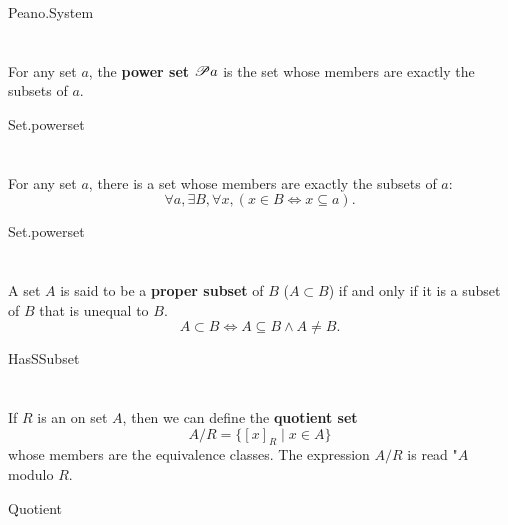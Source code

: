 \documentclass{report}
\begin{document}
    {Peano.System}

\section{}%

  For any set $a$, the \textbf{power set $\mathscr{P}a$} is the set whose
    members are exactly the subsets of $a$.

    {Set.powerset}

\section{}%

  For any set $a$, there is a set whose members are exactly the subsets of $a$:
    $$\forall a, \exists B, \forall x, (x \in B \iff x \subseteq a).$$

    {Set.powerset}

\section{}%

  A set $A$ is said to be a \textbf{proper subset} of $B$ ($A \subset B$) if and
    only if it is a subset of $B$ that is unequal to $B$.
  $$A \subset B \iff A \subseteq B \land A \neq B.$$

    {HasSSubset}

\section{}%

  If $R$ is an  on set $A$, then we can define
    the \textbf{quotient set} $$A / R = \{[x]_R \mid x \in A\}$$ whose members
    are the equivalence classes.
  The expression $A / R$ is read "$A$ modulo $R$.

    {Quotient}

\section{}%
\end{document}
